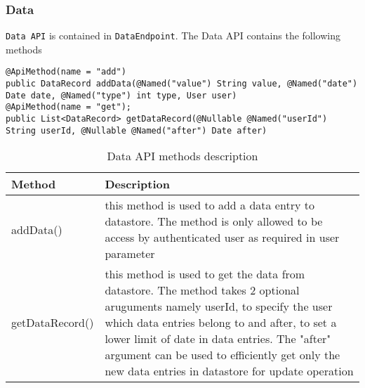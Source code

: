 \subsubsection{Data}
\texttt{Data API} is contained in \texttt{DataEndpoint}. The Data API contains the following methods \\
\begin{minipage}{\linewidth}
\begin{lstlisting}
@ApiMethod(name = "add")
public DataRecord addData(@Named("value") String value, @Named("date") Date date, @Named("type") int type, User user)
@ApiMethod(name = "get");
public List<DataRecord> getDataRecord(@Nullable @Named("userId") String userId, @Nullable @Named("after") Date after)
\end{lstlisting}
\end{minipage}

\begin{table}[h]
\begin{center}
    \begin{tabular}{| l | p{12cm} |}
        \hline Method & Description \\
        \hline addData() & 
            this method is used to add a data entry to datastore. The method is only allowed to be access by
            authenticated user as required in user parameter \\
        \hline getDataRecord() &
            this method is used to get the data from datastore. The method takes 2 optional aruguments namely userId, to
            specify the user which data entries belong to and after, to set a lower limit of date in data entries. The
            "after" argument can be used to efficiently get only the new data entries in datastore for update operation
            \\
        \hline
    \end{tabular}
    \caption{Data API methods description}
\end{center}
\end{table}

